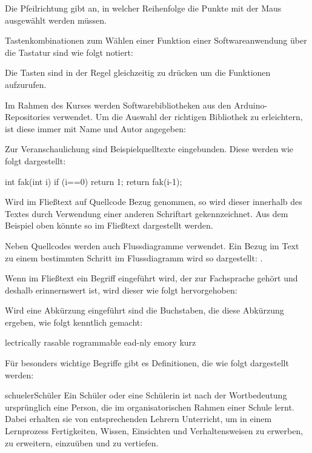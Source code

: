 Die Pfeilrichtung gibt an, in welcher Reihenfolge die Punkte mit der Maus ausgewählt werden müssen.

Tastenkombinationen zum Wählen einer Funktion einer Softwareanwendung über die Tastatur sind wie folgt notiert:

\noindent{}

Die Tasten sind in der Regel gleichzeitig zu drücken um die Funktionen aufzurufen.

Im Rahmen des Kurses werden Softwarebibliotheken aus den Arduino-Repositories verwendet. Um die Auswahl der 
richtigen Bibliothek zu erleichtern, ist diese immer mit Name und Autor angegeben:

\noindent{}

\vfill\null\pagebreak
{}

Zur Veranschaulichung sind Beispielquelltexte eingebunden. Diese werden wie folgt dargestellt:

\begin{src}
  int fak(int i)
  {
    if (i==0) return 1;
    return fak(i-1);
  }
\end{src}

Wird im Fließtext auf Quellcode Bezug genommen, so wird dieser innerhalb des 
Textes durch Verwendung einer anderen Schriftart gekennzeichnet. Aus dem
Beispiel oben könnte so  im Fließtext dargestellt werden.

Neben Quellcodes werden auch Flussdiagramme verwendet. Ein Bezug im Text zu einem bestimmten
Schritt im Flussdiagramm wird so dargestellt: .


Wenn im Fließtext ein Begriff eingeführt wird, der zur Fachsprache gehört und deshalb
erinnernswert ist, wird dieser wie folgt hervorgehoben:

\noindent{}

Wird eine Abkürzung eingeführt sind die Buchstaben, die diese Abkürzung ergeben, wie folgt kenntlich gemacht:

\noindent{}lectrically rasable rogrammable ead-nly emory kurz 

Für besonders wichtige Begriffe gibt es Definitionen, die wie folgt dargestellt werden:

\begin{definition}{schueler}{Schüler}
Ein Schüler oder eine Schülerin ist nach der Wortbedeutung ursprünglich eine Person, die im organisatorischen Rahmen einer Schule lernt. 
Dabei erhalten sie von entsprechenden Lehrern Unterricht, um in einem Lernprozess Fertigkeiten, Wissen, Einsichten und Verhaltensweisen zu erwerben, 
zu erweitern, einzuüben und zu vertiefen. 
\end{definition}

